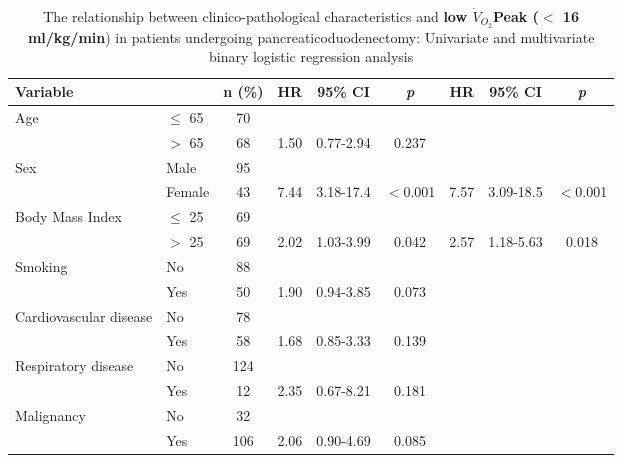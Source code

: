\begin{sidewaystable}[p]
	\caption{The relationship between clinico-pathological characteristics and \textbf{low $\dot{V}_{O_2}$Peak ($<$ 16 ml/kg/min}) in patients undergoing pancreaticoduodenectomy: Univariate and multivariate binary logistic regression analysis}
	\label{table:cpet_oj_peak_regression}
	\setlength{\tabcolsep}{9pt} %
	\centering
	\begin{tabular}{|l l c| c c c| c c c|}
		\hline
		Variable                &           & n (\%) & HR   & 95\% CI   & \textit{p} & HR   & 95\% CI   & \textit{p} \\ \hline
		Age                     & $\leq$ 65 & 70     &      &           &            &      &           &  \\
		                        & $>$ 65    & 68     & 1.50 & 0.77-2.94 & 0.237      &      &           &  \\
		Sex                     & Male      & 95     &      &           &            &      &           &  \\
		                        & Female    & 43     & 7.44 & 3.18-17.4 & $<$0.001   & 7.57 & 3.09-18.5 & $<$0.001   \\
		Body Mass Index         & $\leq$ 25 & 69     &      &           &            &      &           &  \\
		                        & $>$ 25    & 69     & 2.02 & 1.03-3.99 & 0.042      & 2.57 & 1.18-5.63 & 0.018      \\
		Smoking                 & No        & 88     &      &           &            &      &           &  \\
		                        & Yes       & 50     & 1.90 & 0.94-3.85 & 0.073      &      &           &  \\
		Cardiovascular disease  & No        & 78     &      &           &            &      &           &  \\
		                        & Yes       & 58     & 1.68 & 0.85-3.33 & 0.139      &      &           &  \\
		Respiratory disease     & No        & 124    &      &           &            &      &           &  \\
		                        & Yes       & 12     & 2.35 & 0.67-8.21 & 0.181      &      &           &  \\
		Malignancy              & No        & 32     &      &           &            &      &           &  \\
		                        & Yes       & 106    & 2.06 & 0.90-4.69 & 0.085      &      &           &  \\

\end{tabular}
\end{sidewaystable}
